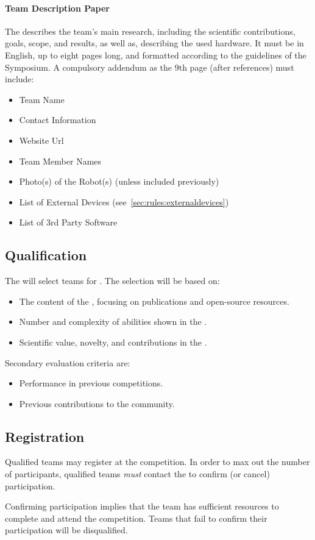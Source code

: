 \paragraph{Team Description Paper}
\label{sec:rules:application:tdp}
The \TDP{} describes the team's main research, including the scientific contributions, goals, scope, and results, as well as, describing the used hardware. It must be in English, up to eight pages long, and formatted according to the guidelines of the \RoboCup{} Symposium. 
A compulsory addendum as the 9th page (after references) must include:
\begin{itemize}
	\item Team Name
	\item Contact Information
	\item Website Url
	\item Team Member Names
	\item Photo(s) of the Robot(s) (unless included previously) 
	\item List of External Devices (see~\ref{sec:rules:externaldevices})
	\item List of 3rd Party Software
\end{itemize}


\subsection{Qualification}
\label{sec:rules:qualification}
The \OC{} will select teams for \Qualification{}. The selection will be based on:
\begin{itemize}
	\item The content of the \TeamWebsite{}, focusing on publications and open-source resources.
	\item Number and complexity of abilities shown in the \TeamVideo{}.
	\item Scientific value, novelty, and contributions in the \TDP{}.

\end{itemize}
Secondary evaluation criteria are:
\begin{itemize}
	\item Performance in previous competitions.
	\item Previous contributions to the \AtHome{} community.
\end{itemize}


\subsection{Registration}
\label{sec:rules:registration}
Qualified teams may register at the \RoboCup\AtHome{} competition. In order to max out the number of participants, qualified teams \emph{must} contact the \OC{} to confirm (or cancel) participation.

Confirming participation implies that the team has sufficient resources to complete \Registration{} and attend the competition. Teams that fail to confirm their participation will be disqualified.
